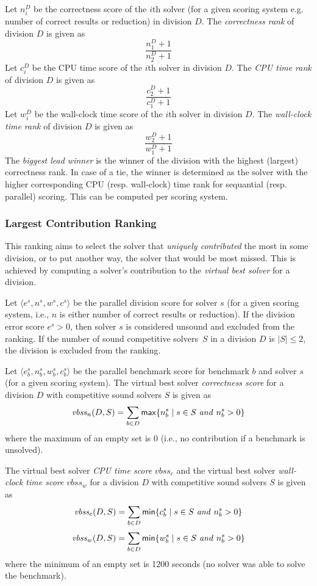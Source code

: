 \documentclass[12pt]{article}
\begin{document}
Let $n_i^D$ be the correctness score of the $i$th solver (for a given scoring
system e.g. number of correct results or reduction) in division $D$.
The \emph{correctness rank} of division $D$ is given as
\[
\frac{n_1^D+1}{n_2^D+1}
\]
Let $c_i^D$ be the CPU time score of the $i$th solver in division $D$.
The \emph{CPU time rank} of division $D$ is given as
\vspace{-1ex}
\[
\frac{c_2^D+1}{c_1^D+1}
\]
Let $w_i^D$ be the wall-clock time score of the $i$th solver in division $D$.
The \emph{wall-clock time rank} of division $D$ is given as
\vspace{-1ex}
\[
\frac{w_2^D+1}{w_1^D+1}
\]
The \emph{biggest lead winner} is the winner of the division with the highest
(largest) correctness rank. In case of a tie, the winner is determined as the
solver with the higher corresponding CPU (resp. wall-clock) time rank for
sequantial (resp. parallel) scoring.
This can be computed per scoring system.

\subsubsection{Largest Contribution Ranking}

This ranking aims to select the solver that \emph{uniquely contributed} the most in some division, or to put another way, the solver that would be most missed. This is achieved by computing a solver's contribution to the \emph{virtual best solver} for a division.

Let $\langle e^s, n^s, w^s, c^s \rangle$ be the parallel division score
for solver $s$ (for a given scoring system, i.e., $n$ is either number of correct
results or reduction).
If the division error score $e^s > 0$, then solver $s$ is considered unsound
and excluded from the ranking.
If the number of sound competitive solvers~$S$ in a division $D$ is $|S| \leq 2$,
the division is excluded from the ranking.

Let $\langle e_b^s, n_b^s, w_b^s, c_b^s \rangle$ be the parallel benchmark
score for benchmark $b$ and solver $s$ (for a given scoring system).
The virtual best solver \emph{correctness score} for a division $D$ with
competitive sound solvers $S$ is given as
\[
\mathit{vbss}_n(D,S) = \sum_{b \in D} {\sf max}\{ n_b^s \mid s \in S ~\mathit{and}~ n_b^s > 0 \}
\]
where the maximum of an empty set is 0 (i.e., no contribution if a benchmark
is unsolved).

The virtual best solver \emph{CPU time score} $\mathit{vbss}_c$ and
the virtual best solver \emph{wall-clock time score} $\mathit{vbss}_w$ for a
division $D$ with competitive sound solvers $S$ is given as
\[
\mathit{vbss}_c(D,S) = \sum_{b \in D} {\sf min}\{ c_b^s \mid s \in S ~\mathit{and}~ n_b^s > 0 \}
\]
\[
\mathit{vbss}_w(D,S) = \sum_{b \in D} {\sf min}\{ w_b^s \mid s \in S ~\mathit{and}~ n_b^s > 0 \}
\]
where the minimum of an empty set is 1200 seconds
(no solver was able to solve the benchmark).
\end{document}
